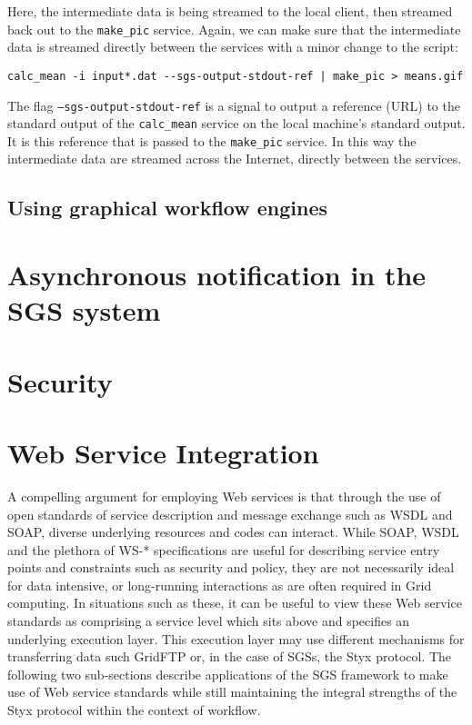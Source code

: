 \documentclass{llncs}
\begin{document}
Here, the intermediate data is being streamed to the local client, then streamed back out to the {\tt make\_pic} service.  Again, we can make sure that the intermediate data is streamed directly between the services with a minor change to the script:

\begin{verbatim}
calc_mean -i input*.dat --sgs-output-stdout-ref | make_pic > means.gif
\end{verbatim}

The flag {\tt --sgs-output-stdout-ref} is a signal to output a reference (URL) to the standard output of the {\tt calc\_mean} service on the local machine's standard output.  It is this reference that is passed to the {\tt make\_pic} service.  In this way the intermediate data are streamed across the Internet, directly between the services.
%
\subsection{Using graphical workflow engines}

%
\section{Asynchronous notification in the SGS system}
%
\section{Security}
%

\section{Web Service Integration}
\label{sec:webservices}

A compelling argument for employing Web services is that through the use of open standards of service description and message exchange such as WSDL and SOAP, diverse underlying resources and codes can interact. While SOAP, WSDL and the plethora of WS-* specifications are useful for describing service entry points and constraints such as security and policy, they are not necessarily ideal for data intensive, or long-running interactions as are often required in Grid computing. In situations such as these, it can be useful to view these Web service standards as comprising a service level which sits above and specifies an underlying execution layer. This execution layer may use different mechanisms for transferring data such GridFTP or, in the case of SGSs, the Styx protocol. The following two sub-sections describe applications of the SGS framework to make use of Web service standards while still maintaining the integral strengths of the Styx protocol within the context of workflow.
\end{document}
